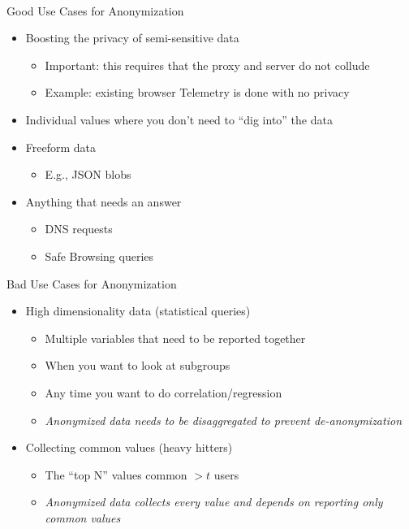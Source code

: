 \documentclass[helvetica]{beamer}
\begin{document}
\begin{frame}{Good Use Cases for Anonymization}

  \begin{itemize}
  \item Boosting the privacy of semi-sensitive data
    \begin{itemize}
    \item Important: this requires that the proxy and server do not collude      
    \item Example: existing browser Telemetry is done with no privacy
    \end{itemize}

  \item Individual values where you don't need to ``dig into'' the data
    
  \item Freeform data
    \begin{itemize}
    \item E.g., JSON blobs
    \end{itemize}

  \item Anything that needs an answer
    \begin{itemize}
    \item DNS requests
    \item Safe Browsing queries
    \end{itemize}
  \end{itemize}
\end{frame}


\begin{frame}{Bad Use Cases for Anonymization}

  \begin{itemize}
  \item High dimensionality data (statistical queries)
    \begin{itemize}
    \item Multiple variables that need to be reported together
    \item When you want to look at subgroups
    \item Any time you want to do correlation/regression
    \item \emph{Anonymized data needs to be disaggregated to prevent de-anonymization}
    \end{itemize}

  \item Collecting common values (heavy hitters)
    \begin{itemize}
    \item The ``top N'' values common $>t$ users
    \item \emph{Anonymized data collects every value and depends on reporting only common values}      
    \end{itemize}
  \end{itemize}
\end{frame}
\end{document}
